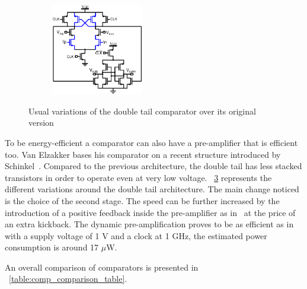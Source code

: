\begin{figure}[htp]
\begin{subfigure}[b]{0.48\textwidth}
        \label{fig:dbl_tail_chan}
    \end{subfigure}
    \begin{subfigure}[b]{0.48\textwidth}
        \centering
        \includegraphics[height=4cm]{Chapter7/Figs/dbl_tail_babayan.ps}
        \label{fig:dbl_tail_babayan}
    \end{subfigure}
	\caption{Usual variations of the double tail comparator over its original version}
	\label{fig:dbl_tail_comp}
\end{figure}

To be energy-efficient a comparator can also have a pre-amplifier that is efficient too. Van Elzakker bases his comparator on a recent structure introduced by Schinkel~\cite{Schinkel2007, Elzakker2010}. Compared to the previous architecture, the double tail has less stacked transistors in order to operate even at very low voltage. \figurename~\ref{fig:dbl_tail_comp} represents the different variations around the double tail architecture. The main change noticed is the choice of the second stage. The speed can be further increased by the introduction of a positive feedback inside the pre-amplifier as in~\cite{Bult1997,Babayan2014} at the price of an extra kickback. The dynamic pre-amplification proves to be as efficient as in~\cite{Savani2015} with a supply voltage of 1 V and a clock at 1 GHz, the estimated power consumption is around 17 \(\mu \)W.

An overall comparison of comparators is presented in \tablename~\ref{table:comp_comparison_table}.

